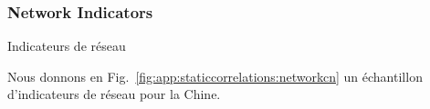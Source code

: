 










\subsubsection{Network Indicators}{Indicateurs de réseau}

Nous donnons en Fig.~\ref{fig:app:staticcorrelations:networkcn} un échantillon d'indicateurs de réseau pour la Chine.

